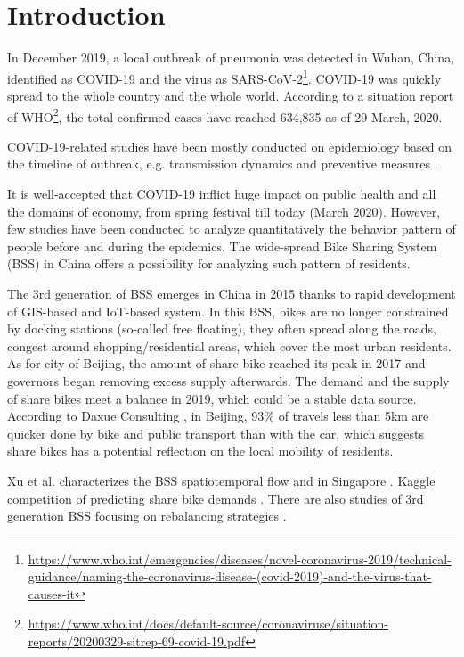 \documentclass[preprints,ijgi,submit,moreauthors]{Definitions/mdpi}
\begin{document}
\section{Introduction}
In December 2019, a local outbreak of pneumonia was detected in Wuhan, China, identified as COVID-19 and the virus as SARS-CoV-2\footnote{\url{https://www.who.int/emergencies/diseases/novel-coronavirus-2019/technical-guidance/naming-the-coronavirus-disease-(covid-2019)-and-the-virus-that-causes-it}}.
COVID-19 was quickly spread to the whole country and the whole world.
According to a situation report of WHO\footnote{\url{https://www.who.int/docs/default-source/coronaviruse/situation-reports/20200329-sitrep-69-covid-19.pdf}}, the total confirmed cases have reached 634,835 as of 29 March, 2020.

COVID-19-related studies have been mostly conducted on epidemiology based on the timeline of outbreak, e.g. transmission dynamics \cite{li2020early} and preventive measures \cite{chinazzi2020effect}.

It is well-accepted that COVID-19 inflict huge impact on public health and all the domains of economy, from spring festival till today (March 2020).
However, few studies have been conducted to analyze quantitatively the behavior pattern of people before and during the epidemics.
The wide-spread Bike Sharing System (BSS)  in China offers a possibility for analyzing such pattern of residents.

The 3rd generation of BSS emerges in China in 2015 thanks to rapid development of GIS-based and IoT-based system. 
In this BSS, bikes are no longer constrained by docking stations (so-called free floating), they often spread along the roads, congest around shopping/residential areas, which cover the most urban residents. 
As for city of Beijing, the amount of share bike reached its peak in 2017 and governors began removing excess supply afterwards. 
The demand and the supply of share bikes meet a balance in 2019, which could be a stable data source.
According to Daxue Consulting \cite{bssmodel}, in Beijing, 93\% of travels less than 5km are quicker done by bike and public transport than with the car, which suggests share bikes has a potential reflection on the local mobility of residents.

Xu et al. characterizes the BSS spatiotemporal flow and in Singapore \cite{xu2019unravel}.
Kaggle competition of predicting share bike demands \cite{kaggle}.
There are also studies of 3rd generation BSS focusing on rebalancing strategies \cite{pal2017free, ai2019deep}.
\end{document}
